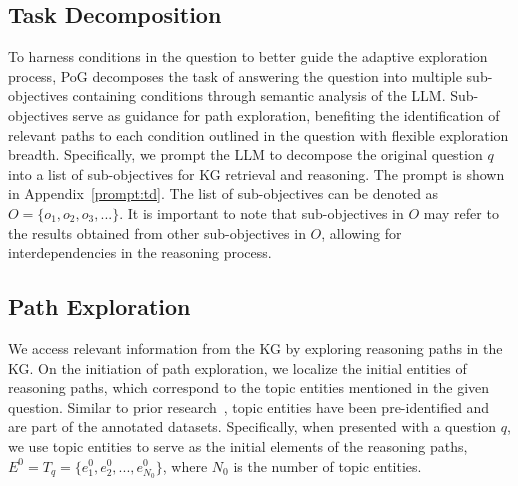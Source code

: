 \documentclass{article}
\begin{document}
\subsection{Task Decomposition}
\vspace{-2mm}
To harness conditions in the question to better guide the adaptive exploration process, PoG decomposes the task of answering the question into multiple sub-objectives containing conditions through semantic analysis of the LLM. 
Sub-objectives serve as guidance for path exploration, benefiting the identification of relevant paths to each condition outlined in the question with flexible exploration breadth.
Specifically, we prompt the LLM to decompose the original question $q$ into a list of sub-objectives for KG retrieval and reasoning. The prompt is shown in Appendix~\ref{prompt:td}.
The list of sub-objectives can be denoted as $O = \{o_1, o_2, o_3, ...\}$.
It is important to note that sub-objectives in $O$ may refer to the results obtained from other sub-objectives in $O$, allowing for interdependencies in the reasoning process.
\vspace{-2mm}
\subsection{Path Exploration}
\vspace{-2mm}
We access relevant information from the KG by exploring reasoning paths in the KG.
On the initiation of path exploration, we localize the initial entities of reasoning paths, which correspond to the topic entities mentioned in the given question. Similar to prior research~\cite{jiang2023structgpt, sun2024think}, topic entities have been pre-identified and are part of the annotated datasets. 
Specifically, when presented with a question $q$, 
we use topic entities to serve as the initial elements of the reasoning paths, $E^0 = T_q = \{e^0_1, e^0_2, ..., e^0_{N_0} \}$, where $N_0$ is the number of topic entities.
\end{document}
